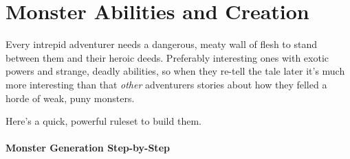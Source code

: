 \chapter{Monster Abilities and Creation}

Every intrepid adventurer needs a dangerous, meaty wall of flesh to stand between them and their heroic deeds. Preferably interesting ones with exotic powers and strange, deadly abilities, so when they re-tell the tale later it’s much more interesting than that \emph{other} adventurers stories about how they felled a horde of weak, puny monsters.


Here’s a quick, powerful ruleset to build them.

\subsubsection{Monster Generation Step-by-Step}
